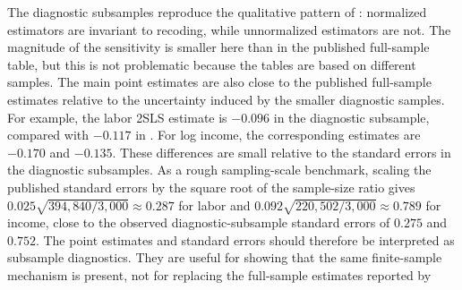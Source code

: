 \documentclass[12pt, a4paper, oneside]{article}
\theoremstyle{plain}
\theoremstyle{definition}
\begin{document}
The diagnostic subsamples reproduce the qualitative pattern of \citet{sloczynski2025abadie}: normalized estimators are invariant to recoding, while unnormalized estimators are not.
The magnitude of the sensitivity is smaller here than in the published full-sample table, but this is not problematic because the tables are based on different samples.
The main point estimates are also close to the published full-sample estimates relative to the uncertainty induced by the smaller diagnostic samples. For example, the labor 2SLS estimate is \(-0.096\) in the diagnostic subsample, compared with \(-0.117\) in \citet{sloczynski2025abadie}. For log income, the corresponding estimates are \(-0.170\) and \(-0.135\). These differences are small relative to the standard errors in the diagnostic subsamples. As a rough sampling-scale benchmark, scaling the published standard errors by the square root of the sample-size ratio gives \(0.025\sqrt{394{,}840/3{,}000}\approx 0.287\) for labor and \(0.092\sqrt{220{,}502/3{,}000}\approx 0.789\) for income, close to the observed diagnostic-subsample standard errors of \(0.275\) and \(0.752\).
 The point estimates and standard errors should therefore be interpreted as subsample diagnostics. They are useful for showing that the same finite-sample mechanism is present, not for replacing the full-sample estimates reported by \citet{sloczynski2025abadie}
\end{document}
